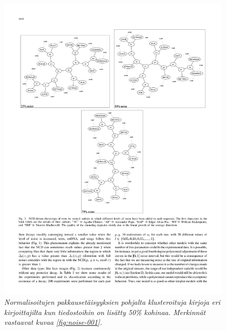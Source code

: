 \documentclass[12pt,finnish]{tktltiki2}
\theoremstyle{definition}
\theoremstyle{remark}
\begin{document}
    \begin{figure}[tb]
      \immediate{}
      \includegraphics{img/noise-002}
      \caption{\emph{Normalisoitujen pakkausetäisyyksien pohjalta klusteroituja kirjoja eri kirjoittajilta kun tiedostoihin on lisätty 50\% kohinaa. Merkinnät vastaavat kuvaa \ref{fig:noise-001}.}
      \cite{4167725}}
      \label{fig:noise-002}
    \end{figure}
\end{document}
